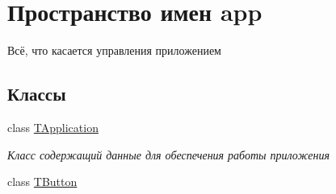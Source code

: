 \hypertarget{namespaceapp}{}\section{Пространство имен app}
\label{namespaceapp}


Всё, что касается управления приложением  


\subsection*{Классы}
\begin{DoxyCompactItemize}
\item 
class \hyperlink{classapp_1_1_t_application}{T\+Application}
\begin{DoxyCompactList}\small\item\em Класс содержащий данные для обеспечения работы приложения \end{DoxyCompactList}\item 
class \hyperlink{classapp_1_1_t_button}{T\+Button}
\end{DoxyCompactItemize}
